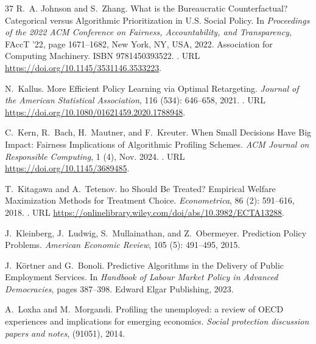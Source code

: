 \documentclass{article} %
\begin{document}
\begin{thebibliography}{37}
R.~A. Johnson and S.~Zhang.
\newblock What is the {B}ureaucratic {C}ounterfactual? {C}ategorical versus {A}lgorithmic {P}rioritization in {U}.{S}. {S}ocial {P}olicy.
\newblock In \emph{Proceedings of the 2022 ACM Conference on Fairness, Accountability, and Transparency}, FAccT '22, page 1671–1682, New York, NY, USA, 2022. Association for Computing Machinery.
\newblock ISBN 9781450393522.
\newblock {}.
\newblock URL \url{https://doi.org/10.1145/3531146.3533223}.

N.~Kallus.
\newblock More {E}fficient {P}olicy {L}earning via {O}ptimal {R}etargeting.
\newblock \emph{Journal of the American Statistical Association}, 116 (534): 646--658, 2021.
\newblock {}.
\newblock URL \url{https://doi.org/10.1080/01621459.2020.1788948}.

C.~Kern, R.~Bach, H.~Mautner, and F.~Kreuter.
\newblock When {S}mall {D}ecisions {H}ave {B}ig {I}mpact: {F}airness {I}mplications of {A}lgorithmic {P}rofiling {S}chemes.
\newblock \emph{ACM Journal on Responsible Computing}, 1 (4), Nov. 2024.
\newblock {}.
\newblock URL \url{https://doi.org/10.1145/3689485}.

T.~Kitagawa and A.~Tetenov.
ho {S}hould {B}e {T}reated? {E}mpirical {W}elfare {M}aximization {M}ethods for {T}reatment {C}hoice.
\newblock \emph{Econometrica}, 86 (2): 591--616, 2018.
\newblock {}.
\newblock URL \url{https://onlinelibrary.wiley.com/doi/abs/10.3982/ECTA13288}.

J.~Kleinberg, J.~Ludwig, S.~Mullainathan, and Z.~Obermeyer.
\newblock Prediction {P}olicy {P}roblems.
\newblock \emph{American Economic Review}, 105 (5): 491--495, 2015.

J.~K{\"o}rtner and G.~Bonoli.
\newblock Predictive {A}lgorithms in the {D}elivery of {P}ublic {E}mployment {S}ervices.
\newblock In \emph{Handbook of Labour Market Policy in Advanced Democracies}, pages 387--398. Edward Elgar Publishing, 2023.

A.~Loxha and M.~Morgandi.
\newblock Profiling the unemployed: a review of {OECD} experiences and implications for emerging economics.
\newblock \emph{Social protection discussion papers and notes},  (91051), 2014.


\end{thebibliography}
\end{document}
